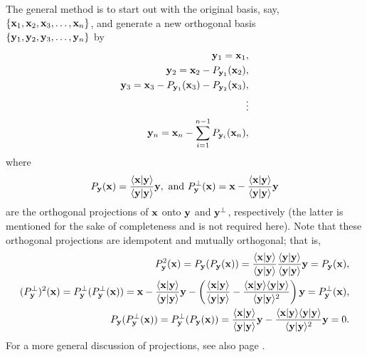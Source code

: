 The general method is to start out with the original basis,
say,  \\
$\{
{\bf x}_1,
{\bf x}_2,
{\bf x}_3,
\ldots ,
{\bf x}_n
\}$,
and generate a new orthogonal basis \\
$\{
{\bf y}_1,
{\bf y}_2,
{\bf y}_3,
\ldots ,
{\bf y}_n
\}$
by
\begin{equation}
\begin{split}
{\bf y}_1={\bf x}_1,\\
{\bf y}_2={\bf x}_2 - P_{{\bf y}_1}({\bf x}_2),\\
{\bf y}_3={\bf x}_3 - P_{{\bf y}_1}({\bf x}_3)- P_{{\bf y}_2}({\bf x}_3),\\
 \vdots \\
{\bf y}_n={\bf x}_n -\sum_{i=1}^{n-1} P_{{\bf y}_i}({\bf x}_n),
\end{split}
\end{equation}
where
\begin{equation}
P_{{\bf y}}({\bf x}) =
\frac{\langle {\bf x}\vert {\bf y} \rangle }
{\langle {\bf y}\vert {\bf y} \rangle }
{\bf y}
,\textrm{ and }
P_{{\bf y}}^\perp ({\bf x}) = {\bf x} -
\frac{\langle {\bf x}\vert {\bf y} \rangle }
{\langle {\bf y}\vert {\bf y} \rangle }
{\bf y}
\end{equation}
are the orthogonal projections of ${\bf x}$ onto ${\bf y}$ and ${\bf y}^\perp$, respectively
(the latter is mentioned for the sake of completeness and is not required here).
\label{2011-m-gsp}
Note that these orthogonal projections are idempotent
and mutually orthogonal; that is,
\begin{equation}
\begin{split}
P_{{\bf y}}^2({\bf x})  = P_{{\bf y}}(P_{{\bf y}}({\bf x}) ) =
\frac{\langle {\bf x}\vert {\bf y} \rangle }
{\langle {\bf y}\vert {\bf y} \rangle }
\frac{\langle {\bf y}\vert {\bf y} \rangle }
{\langle {\bf y}\vert {\bf y} \rangle }
{\bf y} =P_{{\bf y}}({\bf x}),  \\
%
(P_{{\bf y}}^\perp)^2({\bf x})  = P_{{\bf y}}^\perp(P_{{\bf y}}^\perp({\bf x}) ) =
{\bf x}- \frac{\langle {\bf x}\vert {\bf y} \rangle }{\langle {\bf y}\vert {\bf y} \rangle }{\bf y}
-\left(
\frac{\langle {\bf x}\vert {\bf y} \rangle }{\langle {\bf y}\vert {\bf y} \rangle }
-
\frac{\langle {\bf x}\vert {\bf y} \rangle \langle {\bf y}\vert {\bf y}
\rangle}{\langle {\bf y}\vert {\bf y} \rangle^2 }
\right)
{\bf y}
=P_{{\bf y}}^\perp({\bf x}),  \\
P_{{\bf y}}(P_{{\bf y}}^\perp({\bf x}) ) =  P_{{\bf y}}^\perp(P_{{\bf y}}({\bf x}) ) =
\frac{\langle {\bf x}\vert {\bf y} \rangle }{\langle {\bf y}\vert {\bf y} \rangle }{\bf y}
-
\frac{\langle {\bf x}\vert {\bf y} \rangle \langle {\bf y}\vert {\bf y} \rangle}{\langle {\bf y}\vert {\bf y} \rangle^2 }
{\bf y}
=0.
\end{split}
\end{equation}
For a more general discussion of projections, see also page \pageref{2011-m-projec}.

